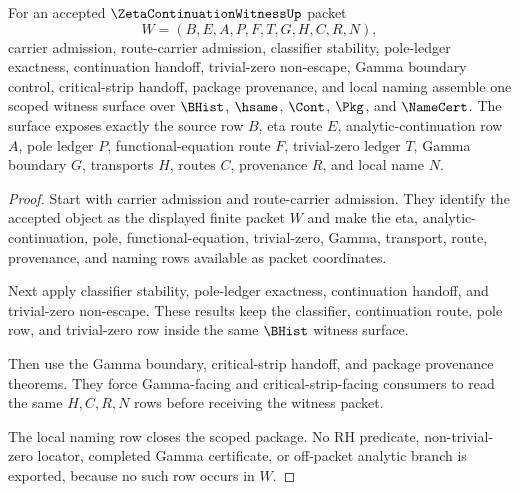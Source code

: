 \begin{theorem}
\label{thm:zeta-continuation-witness-scoped-route-package}
For an accepted $\ZetaContinuationWitnessUp$ packet
$$
W=(B,E,A,P,F,T,G,H,C,R,N),
$$
carrier admission, route-carrier admission, classifier stability, pole-ledger exactness, continuation handoff, trivial-zero non-escape, Gamma boundary control, critical-strip handoff, package provenance, and local naming assemble one scoped witness surface over $\BHist$, $\hsame$, $\Cont$, $\Pkg$, and $\NameCert$. The surface exposes exactly the source row $B$, eta route $E$, analytic-continuation row $A$, pole ledger $P$, functional-equation route $F$, trivial-zero ledger $T$, Gamma boundary $G$, transports $H$, routes $C$, provenance $R$, and local name $N$.
\end{theorem}
\begin{proof}
Start with carrier admission and route-carrier admission. They identify the accepted object as the displayed finite packet $W$ and make the eta, analytic-continuation, pole, functional-equation, trivial-zero, Gamma, transport, route, provenance, and naming rows available as packet coordinates.

Next apply classifier stability, pole-ledger exactness, continuation handoff, and trivial-zero non-escape. These results keep the classifier, continuation route, pole row, and trivial-zero row inside the same $\BHist$ witness surface.

Then use the Gamma boundary, critical-strip handoff, and package provenance theorems. They force Gamma-facing and critical-strip-facing consumers to read the same $H,C,R,N$ rows before receiving the witness packet.

The local naming row closes the scoped package. No RH predicate, non-trivial-zero locator, completed Gamma certificate, or off-packet analytic branch is exported, because no such row occurs in $W$.
\end{proof}

